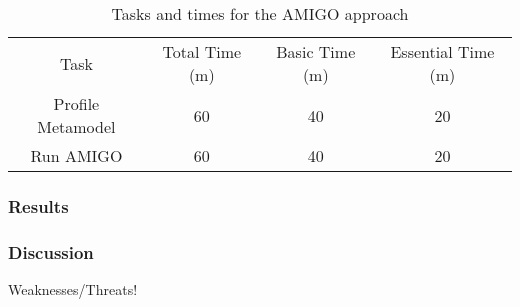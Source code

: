 \begin{table}
    \caption{Tasks and times for the AMIGO approach}
    \centering
    \setlength{\tabcolsep}{3.5pt} 
    \begin{tabular}{|c|c|c|c|}
        Task & Total Time (m) & Basic Time (m) & Essential Time (m) \\ 
        Profile Metamodel & 60 & 40 & 20 \\
        Run AMIGO & 60 & 40 & 20 \\
    \end{tabular}
\end{table}

\subsubsection{Results}



\subsubsection{Discussion}
Weaknesses/Threats!

